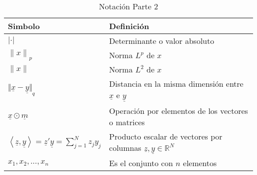 \begin{table}[H]
    \begin{center}
        \begin{tabularx}{\textwidth}{|l|X|}
            \hline
            \textbf{Simbolo}                                                                                                     & \textbf{Definición}                                                                         \\
            \hline
            $ {\lvert \cdot \rvert} $                                                                                            & Determinante o valor absoluto                                                               \\
            $ {\lVert x \rVert}_{p} $                                                                                            & Norma $L^{p}$ de $x$                                                                        \\
            $ {\lVert x \rVert} $                                                                                                & Norma $L^{2}$ de $x$                                                                        \\
            $ {\Vert \underline{x} - \underline{y} \Vert}_{q} $                                                                  & Distancia en la misma dimensión entre $\underline{x}$ e $\underline{y}$                     \\
            $ \underline{x} \odot \underline{m} $                                                                                & Operación por elementos de los vectores o matrices                                          \\
            $ \left\langle \underline{z}, \underline{y} \right\rangle = \underline{z}' \underline{y} = \sum_{j=1}^{N}{z_j y_j} $ & Producto escalar de vectores por columnas $\underline{z}, \underline{y} \in \mathbb{R}^{N}$ \\
            $ {x_{1}, x_{2}, \ldots ,x_{n}} $                                                                                    & Es el conjunto con $n$ elementos                                                            \\
            \hline
        \end{tabularx}
        \caption{Notación Parte 2}
        \label{tab:nnotation-part-2}
    \end{center}
\end{table}


